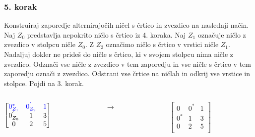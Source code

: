 \documentclass{beamer}
\begin{document}
\begin{frame}
    \frametitle{5. korak}
    \begin{block}{}
        Konstruiraj zaporedje alternirajočih ničel s črtico in zvezdico na naslednji način.
        Naj $Z_0$ predstavlja nepokrito ničlo s črtico iz 4. koraka. Naj $Z_1$ označuje
        ničlo z zvezdico v stolpcu ničle $Z_0$. Z $Z_2$ označimo ničlo s črtico v vrstici
        ničle $Z_1$. Nadaljuj dokler ne prideš do ničle s črtico, ki v svojem stolpcu nima
        ničle z zvezdico. Odznači vse ničle z zvezdico v tem zaporedju in vse ničle s črtico v tem
        zaporedju označi z zvezdico. Odstrani vse črtice na ničlah in odkrij vse vrstice in stolpce.
        Pojdi na 3. korak.
    \end{block}
    \hfill
    \begin{columns}[t]
        \begin{column}{0.25\linewidth}
            $\begin{bmatrix}
                \textcolor{blue}{0^{*}_{Z_1}} & \textcolor{blue}{0^{'}_{Z_2}} & \textcolor{blue}{1}\\
                0^{'}_{Z_0} & 1 & 3\\
                0 & 2 & 5\\	
            \end{bmatrix}$
        \end{column}
        \begin{column}{0.25\linewidth}
         \centering
         $ \rightarrow $
        \end{column}
        \hfill
        \begin{column}{0.25\linewidth}
            \centering
            $\begin{bmatrix}
                0 & 0^{*} & 1\\
                0^{*} & 1 & 3\\
                0 & 2 & 5\\	
            \end{bmatrix}$
        \end{column}
    \end{columns}
\end{frame}
\end{document}
